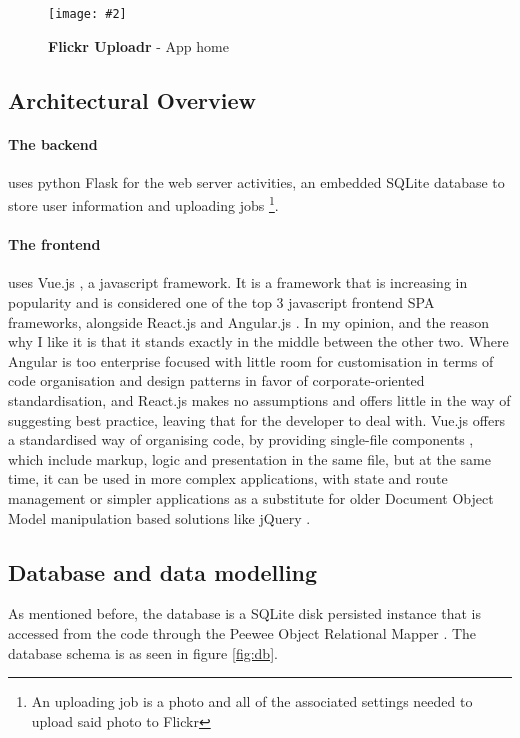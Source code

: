 \documentclass[10pt, a4paper]{article}
\newcommand{\figuremacro}[5]{
\begin{figure}[#1]
\centering
\texttt{[image: \#2]}
\caption[#3]{\textbf{#3}#4}
\label{fig:#2}
\end{figure}
}
\begin{document}
        \figuremacro{h}{app}{Flickr Uploadr}{ - App home}{1.0}

        \subsection{Architectural Overview}
        \paragraph{The backend} uses python Flask \cite{Flask} for the web server activities, an embedded SQLite\cite{SQLite} database to store user information and uploading jobs \footnote{\label{ft:uploading_job} An uploading job is a photo and all of the associated settings needed to upload said photo to Flickr}.

        \paragraph{The frontend} uses Vue.js \cite{Vue.js}, a javascript framework. It is a framework that is increasing in popularity and is considered one of the top 3 javascript frontend SPA frameworks, alongside React.js \cite{React.js} and Angular.js \cite{Angular.js}.
        In my opinion, and the reason why I like it is that it stands exactly in the middle between the other two. Where Angular is too enterprise focused with little room for customisation in terms of code organisation and design patterns in favor of corporate-oriented standardisation, and React.js makes no assumptions and offers little in the way of suggesting best practice, leaving that for the developer to deal with.
        Vue.js offers a standardised way of organising code, by providing single-file components \cite{single_file_components}, which include markup, logic and presentation in the same file, but at the same time, it can be used in more complex applications, with state \cite{Vuex} and route \cite{Vue_Router} management or simpler applications as a substitute for older Document Object Model manipulation based solutions like jQuery \cite{jquery_vue}.


        \subsection{Database and data modelling}
        As mentioned before, the database is a SQLite disk persisted instance that is accessed from the code through the Peewee Object Relational Mapper \cite{peewee}. The database schema is as seen in figure \ref{fig:db}. 
\end{document}
